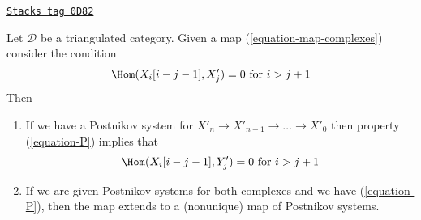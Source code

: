 \begin{lemma}
\label{derived-lemma-maps-postnikov-systems-vanishing}
\href{https://stacks.math.columbia.edu/tag/0D82}{\texttt{Stacks tag 0D82}}

Let $\mathcal{D}$ be a triangulated category. Given a map
(\ref{equation-map-complexes}) consider the condition
\begin{equation}
\label{equation-P}
\Hom(X_i[i - j - 1], X'_j) = 0 \text{ for }i > j + 1
\end{equation}
Then
\begin{enumerate}
\item If we have a Postnikov system for
$X'_n \to X'_{n - 1} \to \ldots \to X'_0$ then
property (\ref{equation-P}) implies that
$$
\Hom(X_i[i - j - 1], Y'_j) = 0 \text{ for }i > j + 1
$$
\item If we are given Postnikov systems for both complexes and
we have (\ref{equation-P}), then the map extends to a (nonunique) map
of Postnikov systems.
\end{enumerate}
\end{lemma}

